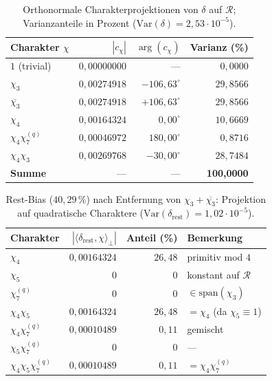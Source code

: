 \begin{table}[ht]
\centering
\caption{Orthonormale Charakterprojektionen von $\delta$ auf $\mathcal{R}$;
Varianzanteile in Prozent ($\mathrm{Var}(\delta)=2{,}53\cdot 10^{-5}$).}
\label{tab:projections}
\begin{tabular}{lrrr}
\toprule
Charakter $\chi$ & $|c_\chi|$ & $\arg(c_\chi)$ & Varianz (\%) \\
\midrule
$1$ (trivial) & $0{,}00000000$ & --- & $0{,}0000$ \\
$\chi_3$ & $0{,}00274918$ & $-106{,}63^\circ$ & $29{,}8566$ \\
$\overline{\chi_3}$ & $0{,}00274918$ & $+106{,}63^\circ$ & $29{,}8566$ \\
$\chi_4$ & $0{,}00164324$ & $0{,}00^\circ$ & $10{,}6669$ \\
$\chi_4\chi_7^{(q)}$ & $0{,}00046972$ & $180{,}00^\circ$ & $0{,}8716$ \\
$\chi_4\chi_3$ & $0{,}00269768$ & $-30{,}00^\circ$ & $28{,}7484$ \\
\midrule
\textbf{Summe} & --- & --- & \textbf{100{,}0000} \\
\bottomrule
\end{tabular}
\end{table}

\begin{table}[ht]
\centering
\caption{Rest-Bias ($40{,}29\,\%$) nach Entfernung von $\chi_3+\overline{\chi_3}$:
Projektion auf quadratische Charaktere ($\mathrm{Var}(\delta_{\mathrm{rest}})=1{,}02\cdot 10^{-5}$).}
\label{tab:rest-breakdown}
\begin{tabular}{lrrl}
\toprule
Charakter & $|\langle\delta_{\mathrm{rest}},\chi\rangle_\perp|$ & Anteil (\%) & Bemerkung \\
\midrule
$\chi_4$ & $0{,}00164324$ & $26{,}48$ & primitiv mod $4$ \\
$\chi_5$ & $0$ & $0$ & konstant auf $\mathcal{R}$ \\
$\chi_7^{(q)}$ & $0$ & $0$ & $\in\mathrm{span}(\chi_3)$ \\
$\chi_4\chi_5$ & $0{,}00164324$ & $26{,}48$ & $=\chi_4$ (da $\chi_5\equiv 1$) \\
$\chi_4\chi_7^{(q)}$ & $0{,}00010489$ & $0{,}11$ & gemischt \\
$\chi_5\chi_7^{(q)}$ & $0$ & $0$ & --- \\
$\chi_4\chi_5\chi_7^{(q)}$ & $0{,}00010489$ & $0{,}11$ & $=\chi_4\chi_7^{(q)}$ \\
\bottomrule
\end{tabular}
\end{table}

